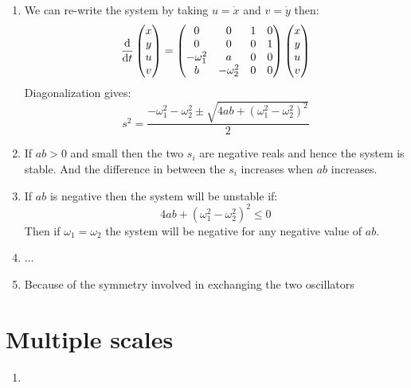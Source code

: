 \documentclass[10pt,a4paper]{book}
\begin{document}
\begin{enumerate}

\item We can re-write the system by taking $u = \dot{x}$ and $v= \dot{y}$ then:
\[
\dv{}{t} \begin{pmatrix}
x\\ y \\ u \\ v
\end{pmatrix} = \begin{pmatrix}
0 & 0 & 1 & 0\\
0 & 0 & 0 & 1\\
-\omega_1^2 & a & 0 & 0\\
b & -\omega_2^2 & 0 & 0
\end{pmatrix} \begin{pmatrix}
x\\y\\u\\v
\end{pmatrix}
\]
Diagonalization gives:
\[
s^2 = \frac{-\omega_1^2 - \omega_2^2 \pm \sqrt{4ab + (\omega_1^2 - \omega_2^2)^2}}{2}
\]

\item If $ab > 0$ and small then the two $s_i$ are negative reals and hence the system is stable. And the difference in between the $s_i$ increases when $ab$ increases. 

\item If $ab$ is negative then the system will be unstable if:
\[
4ab + (\omega_1^2 - \omega_2^2)^2 \leq 0
\]
Then if $\omega_1 = \omega_2$ the system will be negative for any negative value of $ab$.

\item ...

\item Because of the symmetry involved in exchanging the two oscillators

\end{enumerate}

\section{Multiple scales}

\begin{enumerate}

\item 

\end{enumerate}
\end{document}
